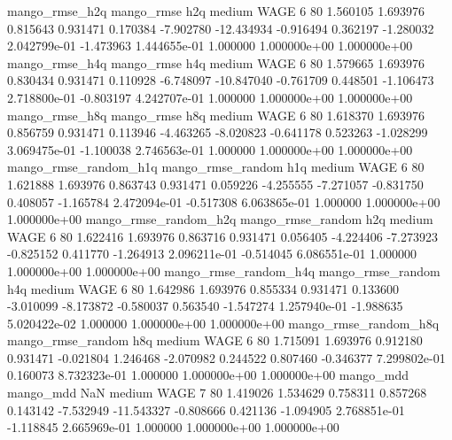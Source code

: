        mango_rmse_h2q        mango_rmse                  h2q     medium     WAGE                 6 80  1.560105       1.693976 0.815643       0.931471    0.170384     -7.902780    -12.434934    -0.916494       0.362197 -1.280032 2.042799e-01    -1.473963   1.444655e-01            1.000000    1.000000e+00        1.000000e+00
       mango_rmse_h4q        mango_rmse                  h4q     medium     WAGE                 6 80  1.579665       1.693976 0.830434       0.931471    0.110928     -6.748097    -10.847040    -0.761709       0.448501 -1.106473 2.718800e-01    -0.803197   4.242707e-01            1.000000    1.000000e+00        1.000000e+00
       mango_rmse_h8q        mango_rmse                  h8q     medium     WAGE                 6 80  1.618370       1.693976 0.856759       0.931471    0.113946     -4.463265     -8.020823    -0.641178       0.523263 -1.028299 3.069475e-01    -1.100038   2.746563e-01            1.000000    1.000000e+00        1.000000e+00
mango_rmse_random_h1q mango_rmse_random                  h1q     medium     WAGE                 6 80  1.621888       1.693976 0.863743       0.931471    0.059226     -4.255555     -7.271057    -0.831750       0.408057 -1.165784 2.472094e-01    -0.517308   6.063865e-01            1.000000    1.000000e+00        1.000000e+00
mango_rmse_random_h2q mango_rmse_random                  h2q     medium     WAGE                 6 80  1.622416       1.693976 0.863716       0.931471    0.056405     -4.224406     -7.273923    -0.825152       0.411770 -1.264913 2.096211e-01    -0.514045   6.086551e-01            1.000000    1.000000e+00        1.000000e+00
mango_rmse_random_h4q mango_rmse_random                  h4q     medium     WAGE                 6 80  1.642986       1.693976 0.855334       0.931471    0.133600     -3.010099     -8.173872    -0.580037       0.563540 -1.547274 1.257940e-01    -1.988635   5.020422e-02            1.000000    1.000000e+00        1.000000e+00
mango_rmse_random_h8q mango_rmse_random                  h8q     medium     WAGE                 6 80  1.715091       1.693976 0.912180       0.931471   -0.021804      1.246468     -2.070982     0.244522       0.807460 -0.346377 7.299802e-01     0.160073   8.732323e-01            1.000000    1.000000e+00        1.000000e+00
            mango_mdd         mango_mdd                  NaN     medium     WAGE                 7 80  1.419026       1.534629 0.758311       0.857268    0.143142     -7.532949    -11.543327    -0.808666       0.421136 -1.094905 2.768851e-01    -1.118845   2.665969e-01            1.000000    1.000000e+00        1.000000e+00
